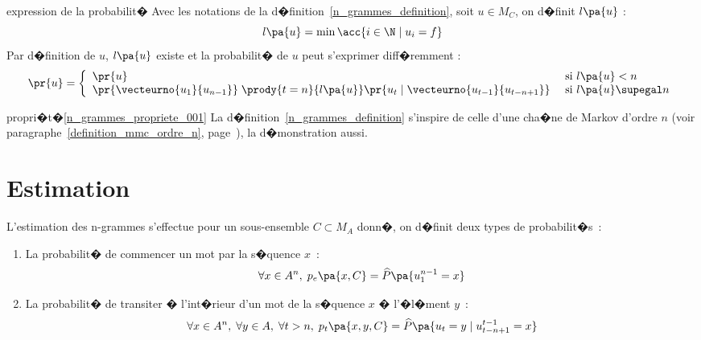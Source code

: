         \begin{xproperty}{expression de la probabilit�}\label{n_grammes_propriete_001}%
        Avec les notations de la d�finition~\ref{n_grammes_definition}, soit $u \in M_C$, on d�finit $l\pa{u}$ :
            $$
            l\pa{u} = \min \acc {i \in \N \; | \; u_i = f }
            $$
        Par d�finition de $u$, $l\pa{u}$ existe et la probabilit� de $u$ peut s'exprimer diff�remment :
            $$
            \pr{u} =
                \left\{
                \begin{array}{ll}
                \pr{u} & \text{ si } l\pa{u} < n \\
                \pr{ \vecteurno{u_1}{u_{n-1}} } \; \prody{t=n}{l\pa{u}} \pr{u_t \; | \; \vecteurno{u_{t-1}}{u_{t-n+1}}}  &
                \text{ si } l\pa{u} \supegal n
                \end{array}
                \right.
            $$
        \end{xproperty}






\begin{xdemo}{propri�t�}{\ref{n_grammes_propriete_001}}
La d�finition~\ref{n_grammes_definition} s'inspire de celle d'une cha�ne de Markov d'ordre $n$ (voir
paragraphe~\ref{definition_mmc_ordre_n}, page~\pageref{definition_mmc_ordre_n}), la d�monstration aussi.
\end{xdemo}













\section{Estimation}

%

L'estimation des n-grammes s'effectue pour un sous-ensemble $C \subset M_A$ donn�, on d�finit deux types de
probabilit�s~:
\begin{enumerate}
%
%
\item La probabilit� de commencer un mot par la s�quence $x$~:
    $$
    \forall x \in A^n, \; p_e\pa{x,C} = \widehat{P}\pa{u_1^{n-1} = x}
    $$
\item La probabilit� de transiter � l'int�rieur d'un mot de la s�quence $x$ � l'�l�ment $y$~:
    $$
    \forall x \in A^n, \; \forall y \in A, \; \forall t > n, \; p_t\pa{x,y,C} = \widehat{P}\pa{u_t = y \; | \;
    u_{t-n+1}^{t-1} = x }
    $$
\end{enumerate}

